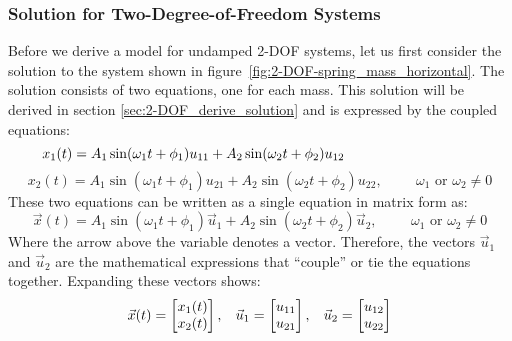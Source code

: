 \documentclass[12pt,letter]{article}
\begin{document}
	\subsubsection{Solution for Two-Degree-of-Freedom Systems}
	Before we derive a model for undamped 2-DOF systems, let us first consider the solution to the system shown in figure~\ref{fig:2-DOF-spring_mass_horizontal}. The solution consists of two equations, one for each mass. This solution will be derived in section \ref{sec:2-DOF_derive_solution} and is expressed by the coupled equations:
	\begin{equation}
		x_1(t) = A_1 \sin (\omega_1 t + \phi_1 )u_{11}+ A_2 \sin (\omega_2 t + \phi_2 )u_{12} \hspace{3.35cm} 
	\end{equation}
	\begin{equation}
		x_2(t) = A_1 \sin (\omega_1 t + \phi_1 )u_{21}+ A_2 \sin (\omega_2 t + \phi_2 )u_{22} , \hspace{1cm} \omega_1 \text{ or } \omega_2 \neq 0 \nonumber
	\end{equation}
	These two equations can be written as a single equation in matrix form as:
	\begin{equation}
		\vec{x}(t) = A_1 \sin (\omega_1 t + \phi_1 )\vec{u}_1 + A_2 \sin (\omega_2 t + \phi_2 )\vec{u}_2 , \hspace{1cm} \omega_1 \text{ or } \omega_2 \neq 0
		\label{eq:2-DOF_solution}
	\end{equation}
	Where the arrow above the variable denotes a vector. Therefore, the vectors $\vec{u}_1$ and $\vec{u}_2$ are the mathematical expressions that ``couple'' or tie the equations together. Expanding these vectors shows: 
	\begin{eqnarray}
	 \vec{x}(t)=  \begin{bmatrix} x_1(t) \\  x_2(t) \end{bmatrix}, \hspace{2ex} \vec{u}_1=  \begin{bmatrix} u_{11} \\  u_{21} \end{bmatrix}, \hspace{2ex} \vec{u}_2=  \begin{bmatrix} u_{12} \\  u_{22} \end{bmatrix}
	\end{eqnarray}
\end{document}
